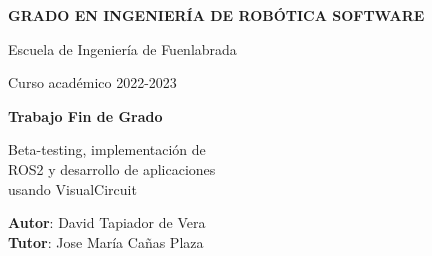 \thispagestyle{empty}
\vspace{2cm}

\begin{figure}[htb]
  \centerline{}
\end{figure}

\begin{center}
  {\Large {\bf GRADO EN INGENIERÍA DE ROBÓTICA SOFTWARE}}
  \vspace{5mm}
 
  {\large {Escuela de Ingeniería de Fuenlabrada}}
  \vspace{5mm}

  {\large {Curso académico 2022-2023}}

  \vspace{1cm}

  {\large {\bf Trabajo Fin de Grado}}

  \vspace{2cm}

  {\Large {Beta-testing, implementación de\\
		  ROS2 y desarrollo de aplicaciones\\
		usando VisualCircuit\\[2cm] }}

  \vspace{5cm}
  {\bf Autor}: David Tapiador de Vera\\
  {\bf Tutor}: Jose María Cañas Plaza
\end{center}

\clearpage
\thispagestyle{empty}
